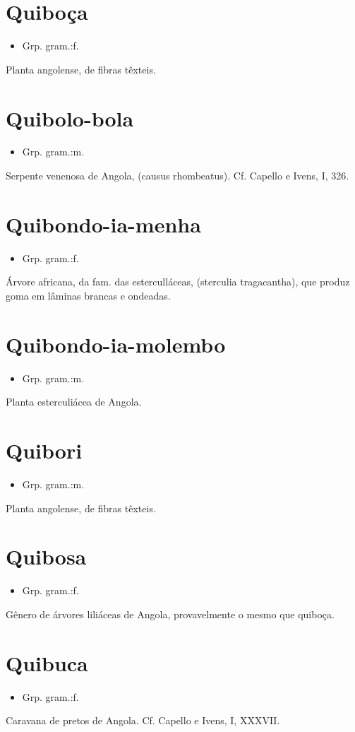 \section{Quiboça}
\begin{itemize}
\item {Grp. gram.:f.}
\end{itemize}
Planta angolense, de fibras têxteis.
\section{Quibolo-bola}
\begin{itemize}
\item {Grp. gram.:m.}
\end{itemize}
Serpente venenosa de Angola, (\textunderscore causus rhombeatus\textunderscore ). Cf. Capello e Ivens, I, 326.
\section{Quibondo-ia-menha}
\begin{itemize}
\item {Grp. gram.:f.}
\end{itemize}
Árvore africana, da fam. das esterculláceas, (\textunderscore sterculia tragacantha\textunderscore ), que produz goma em lâminas brancas e ondeadas.
\section{Quibondo-ia-molembo}
\begin{itemize}
\item {Grp. gram.:m.}
\end{itemize}
Planta esterculiácea de Angola.
\section{Quibori}
\begin{itemize}
\item {Grp. gram.:m.}
\end{itemize}
Planta angolense, de fibras têxteis.
\section{Quibosa}
\begin{itemize}
\item {Grp. gram.:f.}
\end{itemize}
Gênero de árvores liliáceas de Angola, provavelmente o mesmo que \textunderscore quiboça\textunderscore .
\section{Quibuca}
\begin{itemize}
\item {Grp. gram.:f.}
\end{itemize}
Caravana de pretos de Angola. Cf. Capello e Ivens, I, XXXVII.
